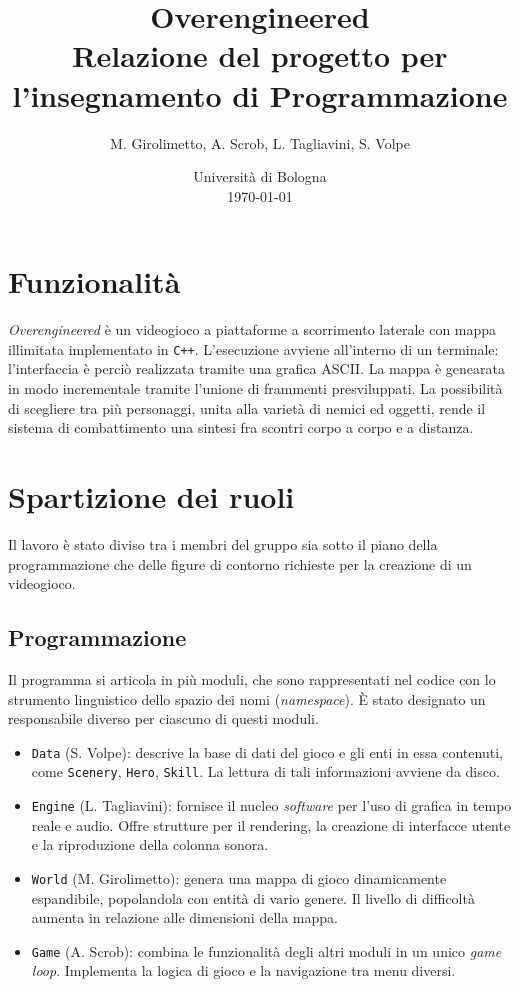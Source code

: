 \documentclass[a4paper]{article}
\title{Overengineered \\
\large Relazione del progetto per l'insegnamento di Programmazione}
\author{
  M. Girolimetto,
  A. Scrob,
  L. Tagliavini,
  S. Volpe
}
\date{
	Universit\`a di Bologna \\
  \today
}
\begin{document}
\maketitle

\section{Funzionalit\`a}

\emph{Overengineered} \`e un videogioco a piattaforme a scorrimento laterale con mappa
illimitata implementato in \verb!C++!. L'esecuzione avviene all'interno di un terminale:
l'interfaccia \`e perci\`o realizzata tramite una grafica ASCII. La mappa \`e
genearata in modo incrementale tramite l'unione di frammenti presviluppati. La
possibilit\`a di scegliere tra pi\`u personaggi, unita alla variet\`a di nemici
ed oggetti, rende il sistema di combattimento una sintesi fra scontri corpo a
corpo e a distanza.

\section{Spartizione dei ruoli}

Il lavoro \`e stato diviso tra i membri del gruppo sia sotto il piano della
programmazione che delle figure di contorno richieste per la creazione di un videogioco.

\subsection{Programmazione}

Il programma si articola in pi\`u moduli, che sono rappresentati nel codice con
lo strumento linguistico dello spazio dei nomi (\emph{namespace}). \`E stato
designato un responsabile diverso per ciascuno di questi moduli.
\begin{itemize}
  \item \verb!Data! (S. Volpe): descrive la base di dati del gioco e gli enti in
    essa contenuti, come \verb!Scenery!, \verb!Hero!, \verb!Skill!. La lettura
    di tali informazioni avviene da disco.
  \item \verb!Engine! (L. Tagliavini): fornisce il nucleo \emph{software} per
    l'uso di grafica in tempo reale e audio. Offre strutture per il rendering,
    la creazione di interfacce utente e la riproduzione della colonna sonora.
  \item \verb!World! (M. Girolimetto): genera una mappa di gioco dinamicamente
    espandibile, popolandola con entit\`a di vario genere. Il livello di
    difficolt\`a aumenta in relazione alle dimensioni della mappa.
  \item \verb!Game! (A. Scrob): combina le funzionalit\`a degli altri moduli in
    un unico \emph{game loop}. Implementa la logica di gioco e la navigazione
    tra menu diversi.
\end{itemize}
\end{document}
